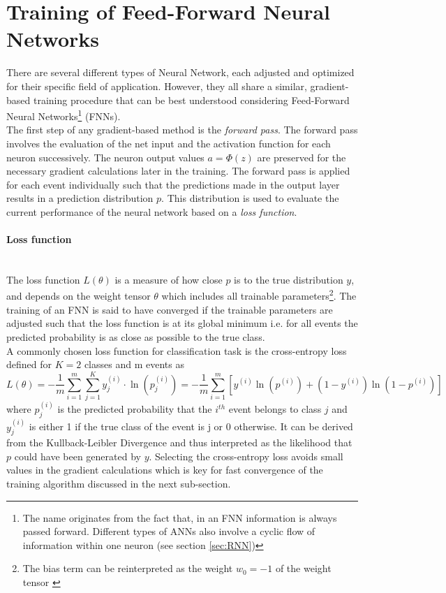 \section{Training of Feed-Forward Neural Networks}
\label{sec:training}
There are several different types of Neural Network, each adjusted and optimized for their specific field of application. However, they all share a similar, gradient-based training procedure that can be best understood considering Feed-Forward Neural Networks\footnote{The name originates from the fact that, in an FNN information is always passed forward. Different types of ANNs also involve a cyclic flow of information within one neuron (see section \ref{sec:RNN})} (FNNs). \\
The first step of any gradient-based method is the \textit{forward pass}. The forward pass involves the evaluation of the net input and the activation function for each neuron successively. The neuron output values $a=\Phi(z)$ are preserved for the necessary gradient calculations later in the training. The forward pass is applied for each event individually such that the predictions made in the output layer results in a prediction distribution $p$. This distribution is used to evaluate the current performance of the neural network based on a \textit{loss function}.

\newpage
\paragraph{Loss function} \mbox{} \\
The loss function $L(\theta)$ is a measure of how close $p$ is to the true distribution $y$, and depends on the weight tensor $\theta$ which includes all trainable parameters\footnote{The bias term can be reinterpreted as the weight $w_0 = -1$ of the weight tensor \cite{NNTheory}}. The training of an FNN is said to have converged if the trainable parameters are adjusted such that the loss function is at its global minimum i.e. for all events the predicted probability is as close as possible to the true class. \\
A  commonly chosen loss function for classification task is the cross-entropy loss \cite{Crossentro} defined for $K=2$ classes and m events as
\begin{equation}
L(\theta) = - \frac{1}{m} \sum^{m}_{i=1} \sum^{K}_{j=1} y^{(i)}_{j} \cdot \ln(p^{(i)}_{j}) = - \frac{1}{m} \sum^{m}_{i=1} [y^{(i)} \ln(p^{(i)}) + (1-y^{(i)})\ln(1-p^{(i)})]
\label{eq:crossent}
\end{equation}
where $p^{(i)}_{j}$ is the predicted probability that the $i^{th}$ event belongs to class $j$ and $y^{(i)}_{j}$ is either 1 if the true class of the event is j or 0 otherwise. It can be derived from the Kullback-Leibler Divergence \cite{Kulldiv} and thus interpreted as the likelihood that $p$ could have been generated by $y$. Selecting the cross-entropy loss avoids small values in the gradient calculations which is key for fast convergence of the training algorithm discussed in the next sub-section.

